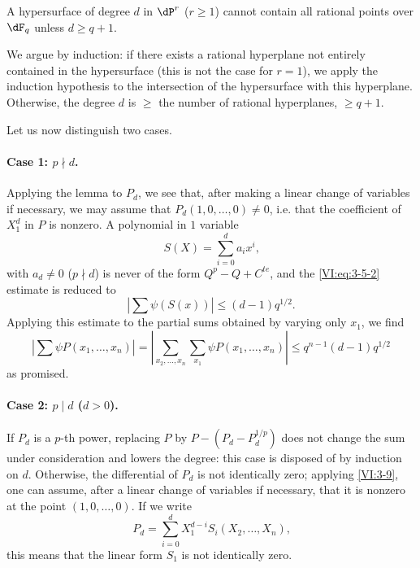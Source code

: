 \documentclass[oneside]{book}
\begin{document}
\begin{lemma_}\label{VI:3-9}
A hypersurface of degree $d$ in $\dP^r$ ($r\geqslant 1$) cannot contain 
all rational points over $\dF_q$ unless $d\geqslant q+1$. 
\end{lemma_}

We argue by induction: if there exists a rational hyperplane not 
entirely contained in the hypersurface (this is not the case for $r=1$), we 
apply the induction hypothesis to the intersection of the hypersurface with this 
hyperplane. Otherwise, the degree $d$ is $\geqslant$ the number of rational 
hyperplanes, $\geqslant q+1$. 

Let us now distinguish two cases. 


\paragraph{Case 1: $p\nmid d$.}
Applying the lemma to $P_d$, we see that, after making a linear change 
of variables if necessary, we may assume that $P_d(1,0,\ldots,0)\ne 0$, i.e. 
that the coefficient of $X_1^d$ in $P$ is nonzero. A polynomial in $1$ 
variable 
\[
  S(X) = \sum_{i=0}^d a_i x^i \text{,} 
\]
with $a_d\ne 0$ ($p\nmid d$) is never of the form $Q^p-Q+C^{t e}$, and 
the \eqref{VI:eq:3-5-2} estimate is reduced to 
\[
  \left| \sum \psi(S(x)) \right| \leqslant (d-1) q^{1/2} \text{.} 
\]
Applying this estimate to the partial sums obtained by varying 
only $x_1$, we find 
\[
  \left| \sum \psi P(x_1,\dots,x_n) \right| = \left| \sum_{x_2,\dots,x_n} \sum_{x_1} \psi P(x_1,\dots,x_n)\right| \leqslant q^{n-1} (d-1) q^{1/2} 
\]
as promised. 


\paragraph{Case 2: $p\mid d$ ($d>0$).}
If $P_d$ is a $p$-th power, replacing $P$ by $P-(P_d-P_d^{1/p})$ 
does not change the sum under consideration and lowers the degree: this case 
is disposed of by induction on $d$. Otherwise, the differential of 
$P_d$ is not identically zero; applying \ref{VI:3-9}, one can assume, 
after a linear change of variables if necessary, that it is nonzero 
at the point $(1,0,\dots,0)$. If we write 
\[
  P_d = \sum_{i=0}^d X_1^{d-i} S_i(X_2,\dots,X_n) \text{,} 
\]
this means that the linear form $S_1$ is not identically zero. 
\end{document}
